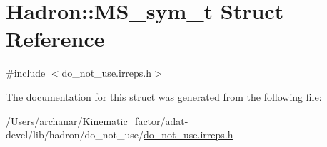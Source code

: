 \hypertarget{structHadron_1_1MS__sym__t}{}\section{Hadron\+:\+:M\+S\+\_\+sym\+\_\+t Struct Reference}
\label{structHadron_1_1MS__sym__t}


{\ttfamily \#include $<$do\+\_\+not\+\_\+use.\+irreps.\+h$>$}



The documentation for this struct was generated from the following file\+:\begin{DoxyCompactItemize}
\item 
/\+Users/archanar/\+Kinematic\+\_\+factor/adat-\/devel/lib/hadron/do\+\_\+not\+\_\+use/\mbox{\hyperlink{adat-devel_2lib_2hadron_2do__not__use_2do__not__use_8irreps_8h}{do\+\_\+not\+\_\+use.\+irreps.\+h}}\end{DoxyCompactItemize}
